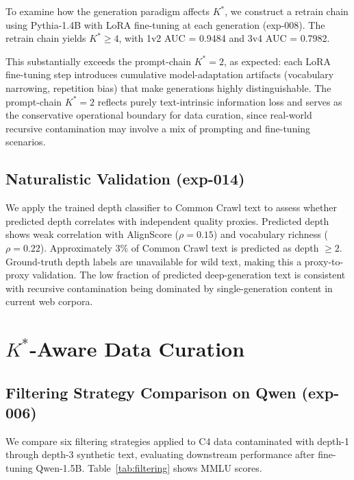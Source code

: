 \documentclass[11pt,a4paper]{article}
\begin{document}
To examine how the generation paradigm affects $K^*$, we construct a retrain chain using Pythia-1.4B with LoRA fine-tuning at each generation (exp-008). The retrain chain yields $K^* \geq 4$, with 1v2 AUC = 0.9484 and 3v4 AUC = 0.7982.

This substantially exceeds the prompt-chain $K^* = 2$, as expected: each LoRA fine-tuning step introduces cumulative model-adaptation artifacts (vocabulary narrowing, repetition bias) that make generations highly distinguishable. The prompt-chain $K^* = 2$ reflects purely text-intrinsic information loss and serves as the conservative operational boundary for data curation, since real-world recursive contamination may involve a mix of prompting and fine-tuning scenarios.

\subsection{Naturalistic Validation (exp-014)}

We apply the trained depth classifier to Common Crawl text to assess whether predicted depth correlates with independent quality proxies. Predicted depth shows weak correlation with AlignScore ($\rho = 0.15$) and vocabulary richness ($\rho = 0.22$). Approximately 3\% of Common Crawl text is predicted as depth $\geq 2$. Ground-truth depth labels are unavailable for wild text, making this a proxy-to-proxy validation. The low fraction of predicted deep-generation text is consistent with recursive contamination being dominated by single-generation content in current web corpora.

\section{$K^*$-Aware Data Curation}
\label{sec:curation}

\subsection{Filtering Strategy Comparison on Qwen (exp-006)}

We compare six filtering strategies applied to C4 data contaminated with depth-1 through depth-3 synthetic text, evaluating downstream performance after fine-tuning Qwen-1.5B. Table~\ref{tab:filtering} shows MMLU scores.
\end{document}
